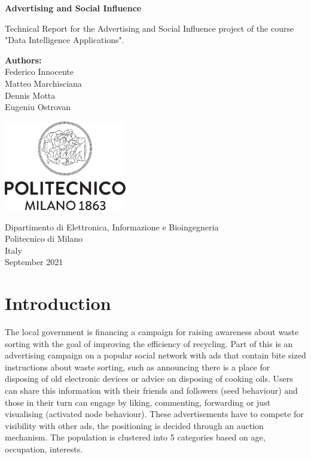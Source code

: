 \documentclass{article}
\begin{document}
\begin{titlepage}
    \begin{center}
       \vspace*{4cm}

       \textbf{\LARGE Advertising and Social Influence}

       \vspace{1.5cm}
        Technical Report for the Advertising and Social Influence project of the course "Data Intelligence Applications".
            
       \vfill

       \textbf{Authors:}\\
       Federico Innocente\\
       Matteo Marchisciana\\
       Dennis Motta\\
       Eugeniu Ostrovan

       \vspace{0.8cm}
     
       \includegraphics[width=0.4\textwidth]{images/Logo_Politecnico_Milano.png}
            
       Dipartimento di Elettronica, Informazione e Bioingegneria\\
       Politecnico di Milano\\
       Italy\\
       September 2021
            
   \end{center}
\end{titlepage}



\tableofcontents
\newpage



\section{Introduction}
The local government is financing a campaign for raising awareness about waste sorting with the goal of improving the efficiency of recycling. Part of this is an advertising campaign on a popular social network with ads that contain bite sized instructions about waste sorting, such as announcing there is a place for disposing of old electronic devices or advice on disposing of cooking oils. Users can share this information with their friends and followers (seed behaviour) and those in their turn can engage by liking, commenting, forwarding or just visualising (activated node behaviour). These advertisements have to compete for visibility with other ads, the positioning is decided through an auction mechanism. The population is clustered into 5 categories based on age, occupation, interests.
\end{document}
